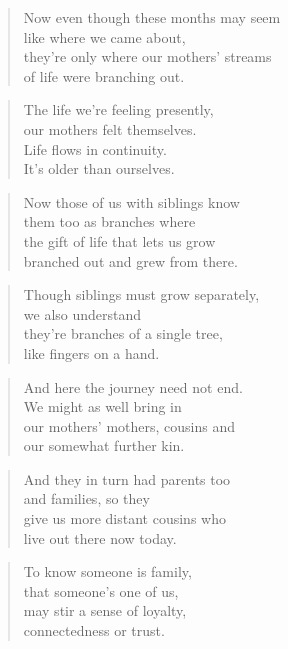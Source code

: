 \documentclass[10pt,a4paper]{article}
\begin{document}
\begin{paracol}{2}
\begin{verse}
Now even though these months may seem\\
like where we came about,\\
they’re only where our mothers’ streams\\
of life were branching out.
\end{verse}

\begin{verse}
The life we’re feeling presently,\\
our mothers felt themselves.\\
Life flows in continuity.\\
It’s older than ourselves.
\end{verse}

\begin{verse}
Now those of us with siblings know\\
them too as branches where\\
the gift of life that lets us grow\\
branched out and grew from there.
\end{verse}

\begin{verse}
Though siblings must grow separately,\\
we also understand\\
they’re branches of a single tree,\\
like fingers on a hand.
\end{verse}

\begin{verse}
And here the journey need not end.\\
We might as well bring in\\
our mothers’ mothers, cousins and\\
our somewhat further kin.
\end{verse}

\begin{verse}
And they in turn had parents too\\
and families, so they\\
give us more distant cousins who\\
live out there now today.
\end{verse}

\begin{verse}
To know someone is family,\\
that someone’s one of us,\\
may stir a sense of loyalty,\\
connectedness or trust.
\end{verse}


\end{paracol}
\end{document}
